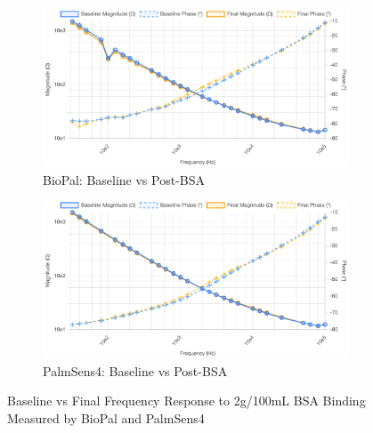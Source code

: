 \begin{figure}[H]
    \centering
    \begin{subfigure}{0.48\textwidth}
        \includegraphics[width=\textwidth]{2g-100mL BioPal.png}
        \caption{BioPal: Baseline vs Post-BSA}
        \label{fig:2g_biopal}
    \end{subfigure}
    \hfill
    \begin{subfigure}{0.48\textwidth}
        \includegraphics[width=\textwidth]{PalmSens2g.png}
        \caption{PalmSens4: Baseline vs Post-BSA}
        \label{fig:2g_palmsens}
    \end{subfigure}
    \caption{Baseline vs Final Frequency Response to 2g/100mL BSA Binding Measured by BioPal and PalmSens4}
    \label{fig:2g_bsa_comparison_final}
\end{figure}

